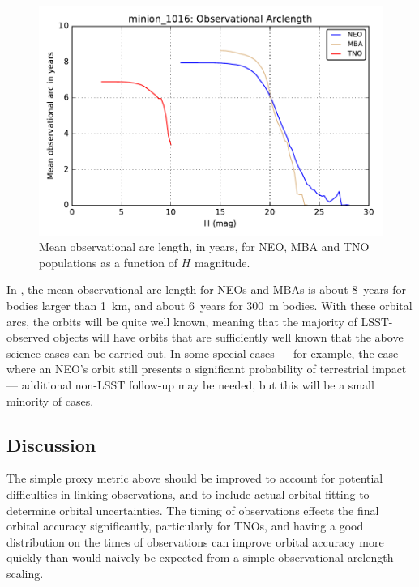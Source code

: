 \begin{figure}
\includegraphics[width=6in]{figs/solarsystem/minion_1016_ObsArc_neo_tno_mba_MOOB_ComboMetricVsH.pdf}
\caption{Mean observational arc length, in years, for NEO, MBA and TNO
  populations as a function of $H$ magnitude.
\label{obsarc}}
\end{figure}

In , the mean observational arc length for
NEOs and MBAs is about 8~years for bodies larger than 1~km, and about
6~years for 300~m bodies. With these
orbital arcs, the orbits will be quite well known,
meaning that the majority
of LSST-observed objects will have orbits that are sufficiently
well known that the above science cases can be carried out.
In some special cases --- for example, the case where
an NEO's orbit still presents a significant probability
of terrestrial impact --- additional non-LSST follow-up
may be needed, but this will be a small minority of cases.



\subsection{Discussion}
\label{sec:\secname:discussion}

The simple proxy metric above should be improved to account for
potential difficulties in linking observations, and to include actual
orbital fitting to determine orbital uncertainties. The timing of
observations effects the final orbital accuracy significantly,
particularly for TNOs, and having a good distribution on the times of
observations can improve orbital accuracy more quickly than would
naively be expected from a simple observational arclength scaling.

